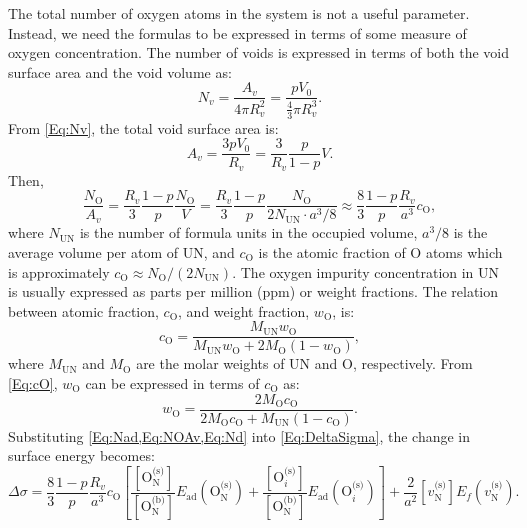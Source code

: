 \documentclass[preprint,12pt,sort&compress]{elsarticle}
\newcommand{\?}{\stackrel{?}{=}}
\begin{document}
The total number of oxygen atoms in the system is not a useful parameter. Instead, we need the formulas to be expressed in terms of some measure of oxygen concentration. The number of voids is expressed in terms of both the void surface area and the void volume as:
\begin{equation}
N_v = \frac{A_v}{4 \pi R_v^2} = \frac{ p V_0 }{ \frac{4}{3} \pi R_v^3 }.
\label{Eq:Nv}
\end{equation}
From \cref{Eq:Nv}, the total void surface area is:
\begin{equation}
A_v = \frac{3 p V_0}{R_v} = \frac{3}{R_v} \frac{p}{1-p} V.
\label{Eq:Av}
\end{equation}
Then,
\begin{equation}
\frac{N_\text{O}}{A_v} = \frac{R_v}{3} \frac{1-p}{p} \frac{N_\text{O}}{V} = \frac{R_v}{3} \frac{1-p}{p} \frac{N_\text{O}}{ 2 N_\text{UN} \cdot a^3/8 } \approx \frac{8}{3} \frac{1-p}{p} \frac{R_v}{a^3} c_\text{O}, 
\label{Eq:NOAv}
\end{equation}
where $N_\text{UN}$ is the number of formula units in the occupied volume, $a^3/8$ is the average volume per atom of UN, and $c_\text{O}$ is the atomic fraction of O atoms which is approximately $c_\text{O} \approx N_\text{O}/( 2N_\text{UN})$. The oxygen impurity concentration in UN is usually expressed as parts per million (ppm) or weight fractions. The relation between atomic fraction, $c_\text{O}$, and weight fraction, $w_\text{O}$, is:
\begin{equation}
c_\text{O} = \frac{ M_\text{UN} w_\text{O} }{ M_\text{UN} w_\text{O} + 2 M_\text{O} ( 1 - w_\text{O} ) },
\label{Eq:cO}
\end{equation}
where $M_\text{UN}$ and $M_\text{O}$ are the molar weights of UN and O, respectively. From \cref{Eq:cO}, $w_\text{O}$ can be expressed in terms of $c_\text{O}$ as:
\begin{equation}
w_\text{O} = \frac{ 2 M_\text{O} c_\text{O} }{ 2 M_\text{O} c_\text{O} + M_\text{UN} ( 1 - c_\text{O} ) }.
\end{equation}
Substituting \cref{Eq:Nad,Eq:NOAv,Eq:Nd} into \cref{Eq:DeltaSigma}, the change in surface energy becomes:
\begin{equation}
\Delta \sigma = \frac{8}{3} \frac{1-p}{p} \frac{R_v}{a^3} c_\text{O} \left[ \frac{ [ \text{O}_\text{N}^{\text{(s)}} ] }{ [ \text{O}_\text{N}^{\text{(b)}} ] }  E_\text{ad}( \text{O}_\text{N}^{\text{(s)}} ) + \frac{ [ \text{O}_i^{\text{(s)}} ] }{ [ \text{O}_\text{N}^{\text{(b)}} ] }  E_\text{ad}( \text{O}_i^{\text{(s)}} ) \right] + \frac{2}{a^2} [ v_\text{N}^{\text{(s)}} ] E_f ( v_\text{N}^{\text{(s)}} ).
\end{equation}
\end{document}
